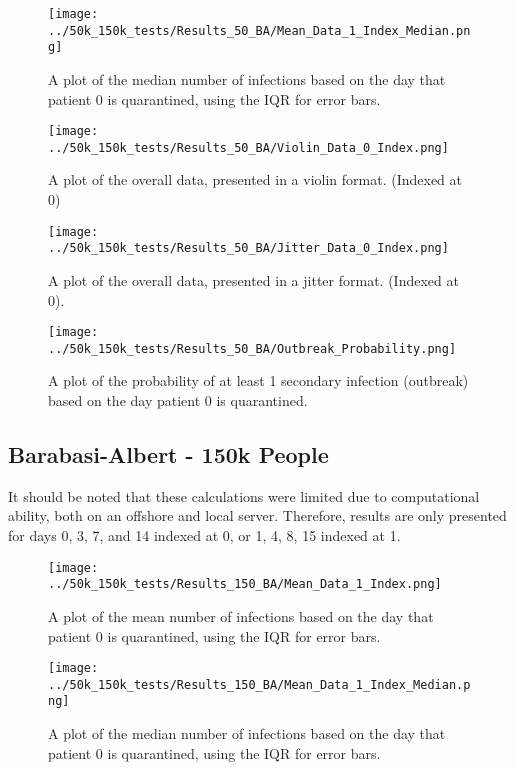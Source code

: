 \documentclass{article}
\numberwithin{equation}{section} %
\begin{document}
\begin{figure}[H]
  \centering
  \texttt{[image: ../50k\_150k\_tests/Results\_50\_BA/Mean\_Data\_1\_Index\_Median.png]}
  \caption{A plot of the median number of infections based on the day that patient 0 is quarantined, using the IQR for error bars.}
\end{figure}

\begin{figure}[H]
  \centering
  \texttt{[image: ../50k\_150k\_tests/Results\_50\_BA/Violin\_Data\_0\_Index.png]}
  \caption{A plot of the overall data, presented in a violin format. (Indexed at 0)}
\end{figure}

\begin{figure}[H]
  \centering
  \texttt{[image: ../50k\_150k\_tests/Results\_50\_BA/Jitter\_Data\_0\_Index.png]}
  \caption{A plot of the overall data, presented in a jitter format. (Indexed at 0).}
\end{figure}

\begin{figure}[H]
  \centering
  \texttt{[image: ../50k\_150k\_tests/Results\_50\_BA/Outbreak\_Probability.png]}
  \caption{A plot of the probability of at least 1 secondary infection (outbreak) based on the day patient 0 is quarantined.}
\end{figure}

\subsection{Barabasi-Albert - 150k People}
It should be noted that these calculations were limited due to computational ability, both on an offshore and local server. Therefore, results are only presented for days 0, 3, 7, and 14 indexed at 0, or 1, 4, 8, 15 indexed at 1.
\begin{figure}[H]
  \centering
  \texttt{[image: ../50k\_150k\_tests/Results\_150\_BA/Mean\_Data\_1\_Index.png]}
  \caption{A plot of the mean number of infections based on the day that patient 0 is quarantined, using the IQR for error bars.}
\end{figure}

\begin{figure}[H]
  \centering
  \texttt{[image: ../50k\_150k\_tests/Results\_150\_BA/Mean\_Data\_1\_Index\_Median.png]}
  \caption{A plot of the median number of infections based on the day that patient 0 is quarantined, using the IQR for error bars.}
\end{figure}
\end{document}
